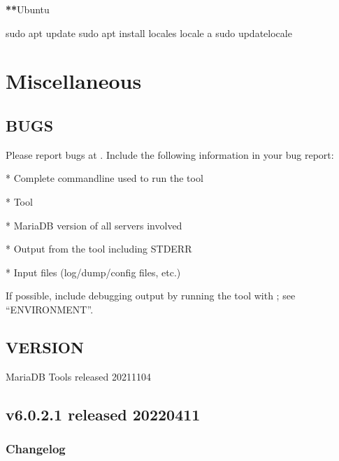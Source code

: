 \documentclass[letterpaper,10pt,english]{sphinxmanual}
\begin{document}
{\color{red}\bfseries{}**}Ubuntu

\begin{sphinxVerbatim}[commandchars=\\\{\}]
sudo apt update
sudo apt install locales
locale \PYGZhy{}a
sudo update\PYGZhy{}locale 
\end{sphinxVerbatim}


\part{Miscellaneous}
\label{\detokenize{index:miscellaneous}}

\chapter{BUGS}
\label{\detokenize{bugs:bugs}}\label{\detokenize{bugs::doc}}
Please report bugs at .
Include the following information in your bug report:

* Complete command\sphinxhyphen{}line used to run the tool

* Tool 

* MariaDB version of all servers involved

* Output from the tool including STDERR

* Input files (log/dump/config files, etc.)

If possible, include debugging output by running the tool with ;
see “ENVIRONMENT”.


\chapter{VERSION}
\label{\detokenize{version:version}}\label{\detokenize{version::doc}}
MariaDB Tools released 2021\sphinxhyphen{}11\sphinxhyphen{}04


\chapter{v6.0.2.1 released 2022\sphinxhyphen{}04\sphinxhyphen{}11}
\label{\detokenize{release_notes:v6-0-2-1-released-2022-04-11}}\label{\detokenize{release_notes::doc}}

\section{Changelog}
\label{\detokenize{release_notes:changelog}}


\renewcommand{\indexname}{Index}
\printindex
\end{document}
